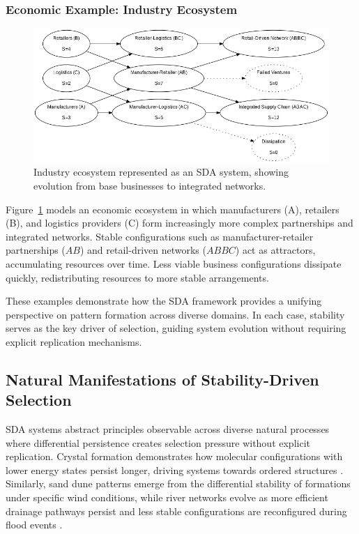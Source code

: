 \documentclass[preprint,12pt]{elsarticle}
\begin{document}
\subsubsection{Economic Example: Industry Ecosystem}

\begin{figure}[h]
    \centering
    \includegraphics[width=1\textwidth]{figure_14.png}
    \caption{Industry ecosystem represented as an SDA system, showing evolution from base businesses to integrated networks.}
    \label{fig:figure_14}
\end{figure}

Figure~\ref{fig:figure_14} models an economic ecosystem in which manufacturers (A), retailers (B), and logistics providers (C) form increasingly more complex partnerships and integrated networks. Stable configurations such as manufacturer-retailer partnerships (\( AB \)) and retail-driven networks (\( ABBC \)) act as attractors, accumulating resources over time. Less viable business configurations dissipate quickly, redistributing resources to more stable arrangements.

These examples demonstrate how the SDA framework provides a unifying perspective on pattern formation across diverse domains. In each case, stability serves as the key driver of selection, guiding system evolution without requiring explicit replication mechanisms.

\subsection{Natural Manifestations of Stability-Driven Selection}

SDA systems abstract principles observable across diverse natural processes where differential persistence creates selection pressure without explicit replication. Crystal formation demonstrates how molecular configurations with lower energy states persist longer, driving systems towards ordered structures \cite{ball1999self}. Similarly, sand dune patterns emerge from the differential stability of formations under specific wind conditions, while river networks evolve as more efficient drainage pathways persist and less stable configurations are reconfigured during flood events \cite{kelso1997dynamic}.
\end{document}
